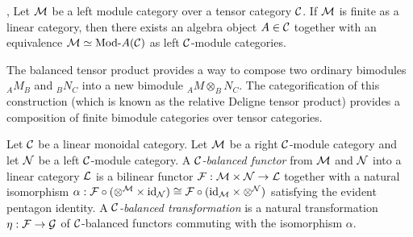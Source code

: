 \documentclass{amsart}
\begin{document}
\begin{theorem}{\cite[Thm 2.11.6]{EGNO}, \cite[Thm 1]{MR1976459}} \label{thm:EGNO2.11.6}
	Let $\mathcal M$ be a left module category over a tensor category $\mathcal C$. If $\mathcal M$ is finite as a linear category, then there exists an algebra object $A \in \mathcal C$ together with an equivalence $\cM \simeq \Mod{}{A} (\cC)$ as left $\mathcal C$-module categories.
\end{theorem}




The balanced tensor product provides a way to compose two ordinary bimodules $_A M_B$ and $_B N_C$ into a new bimodule $_A M \otimes_B N_C$.  The categorification of this construction (which is known as the relative Deligne tensor product) provides a composition of finite bimodule categories over tensor categories.

\begin{definition}
	Let $\mathcal C$ be a linear monoidal category. 
	Let $\mathcal M$ be a right $\mathcal C$-module category and let $\mathcal N$ be a left $\mathcal C$-module category. A {\em $\mathcal C$-balanced functor} from $\mathcal M$ and $\mathcal N$ into a linear category $\mathcal L$ is a bilinear functor $\mathcal F: \mathcal M \times \mathcal N \to \mathcal L$ together with a natural isomorphism $\alpha: \mathcal F \circ (\otimes^{\mathcal M} \times \mathrm{id}_{\mathcal N}) \cong \mathcal F \circ (\mathrm{id}_{\mathcal M} \times \otimes^{\mathcal N})$ satisfying the evident pentagon identity. A {\em $\mathcal C$-balanced transformation} is a natural transformation $\eta:\mathcal F \to \mathcal G$ of $\mathcal C$-balanced functors commuting with the isomorphism $\alpha$.
\end{definition}
\end{document}
